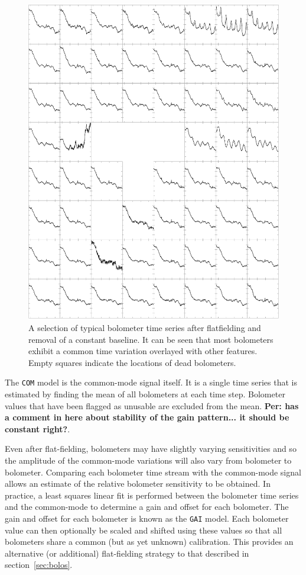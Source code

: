 \documentclass[useAMS,usenatbib,nofootinbib]{mn2e}
\newcommand{\model}[1]{\texttt{#1}}
\begin{document}
\begin{figure}
\centering
\includegraphics[width=\linewidth]{com.pdf}
\caption{A selection of typical bolometer time series after
flatfielding and removal of a constant baseline. It can be seen that
most bolometers exhibit a common time variation overlayed with other
features. Empty squares indicate the locations of dead bolometers.}
\label{fig:com}
\end{figure}

The \model{COM} model is the common-mode signal itself. It is a single
time series that is estimated by finding the mean of all bolometers at
each time step. Bolometer values that have been flagged as unusable
are excluded from the mean. {\bf Per: has a comment in
here about stability of the gain pattern... it should be constant
right?}.

Even after flat-fielding, bolometers may have slightly varying
sensitivities and so the amplitude of the common-mode variations will
also vary from bolometer to bolometer. Comparing each bolometer time
stream with the common-mode signal allows an estimate of the relative
bolometer sensitivity to be obtained. In practice, a least squares linear
fit is performed between the bolometer time series and the common-mode to
determine a gain and offset for each bolometer.  The gain and offset for
each bolometer is known as the \model{GAI} model. Each bolometer value
can then optionally be scaled and shifted using these values so that all
bolometers share a common (but as yet unknown) calibration. This provides
an alternative (or additional) flat-fielding strategy to that described
in section~\ref{sec:bolos}.
\end{document}
